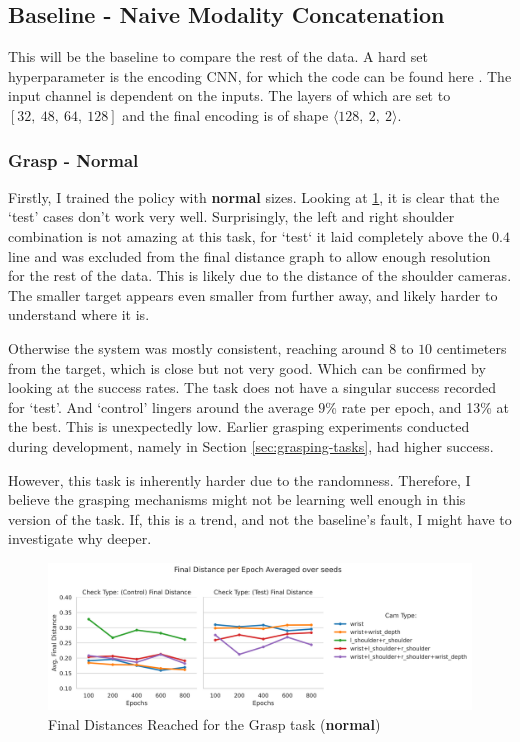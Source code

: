 \subsection{Baseline - Naive Modality Concatenation}
This will be the baseline to compare the rest of the data. A hard set hyperparameter is the encoding CNN, for which the code can be found here . The input channel is dependent on the inputs. The layers of which are set to $\left[32, ~48, ~64, ~128\right]$ and the final encoding is of shape \(\langle 128, ~2, ~2 \rangle\).

\subsubsection{Grasp - Normal}
Firstly, I trained the policy with \textbf{normal} sizes. Looking at \ref{fig:base-grasp-final-normal}, it is clear that the `test' cases don't work very well. Surprisingly, the left and right shoulder combination is not amazing at this task, for `test` it laid completely above the $0.4$ line and was excluded from the final distance graph to allow enough resolution for the rest of the data. This is likely due to the distance of the shoulder cameras. The smaller target appears even smaller from further away, and likely harder to understand where it is. 

Otherwise the system was mostly consistent, reaching around $8$ to $10$ centimeters from the target, which is close but not very good. Which can be confirmed by looking at the success rates. The task does not have a singular success recorded for `test'. And `control' lingers around the average $9$\% rate per epoch, and 13\% at the best. This is unexpectedly low. Earlier grasping experiments conducted during development, namely in Section \ref{sec:grasping-tasks}, had higher success. 

However, this task is inherently harder due to the randomness. Therefore, I believe the grasping mechanisms might not be learning well enough in this version of the task. If, this is a trend, and not the baseline's fault, I might have to investigate why deeper.

\begin{figure}[H]
  \centering
  \includegraphics[width=\linewidth]{assets/evaluation/baseline/base-grasp-final.png}
  \caption{Final Distances Reached for the Grasp task (\textbf{normal})}\label{fig:base-grasp-final-normal}
\end{figure}

